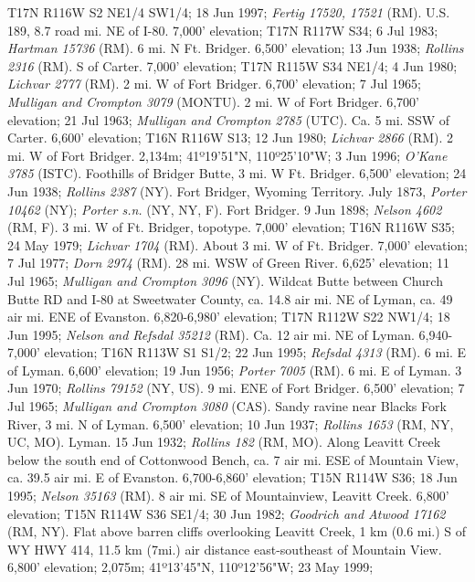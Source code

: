 T17N R116W S2 NE1/4 SW1/4; 18 Jun 1997; \textit{Fertig 17520, 17521} (RM).
U.S. 189, 8.7 road mi. NE of I-80. 7,000' elevation; T17N R117W S34; 6 Jul 1983;
\textit{Hartman 15736} (RM).
6 mi. N Ft. Bridger. 6,500' elevation; 13 Jun 1938; \textit{Rollins 2316} (RM).
S of Carter. 7,000' elevation; T17N R115W S34 NE1/4; 4 Jun 1980;
\textit{Lichvar 2777} (RM).
2 mi. W of Fort Bridger. 6,700’ elevation; 7 Jul 1965;
\textit{Mulligan and Crompton 3079} (MONTU).
2 mi. W of Fort Bridger. 6,700’ elevation; 21 Jul 1963;
\textit{Mulligan and Crompton 2785} (UTC).
Ca. 5 mi. SSW of Carter. 6,600' elevation; T16N R116W S13; 12 Jun 1980;
\textit{Lichvar 2866} (RM).
2 mi. W of Fort Bridger. 2,134m; 41º19'51"N, 110º25'10"W; 3 Jun 1996;
\textit{O'Kane 3785} (ISTC).
Foothills of Bridger Butte, 3 mi. W Ft. Bridger. 6,500’ elevation; 24 Jun 1938;
\textit{Rollins 2387} (NY).
Fort Bridger, Wyoming Territory. July 1873, \textit{Porter 10462} (NY);
\textit{Porter s.n.} (NY, NY, F).
Fort Bridger. 9 Jun 1898; \textit{Nelson 4602} (RM, F).
3 mi. W of Ft. Bridger, topotype.	7,000' elevation; T16N R116W S35; 24 May 1979;
\textit{Lichvar 1704} (RM).
About 3 mi. W of Ft. Bridger. 7,000' elevation;	7 Jul 1977;
\textit{Dorn 2974} (RM).
28 mi. WSW of Green River. 6,625’ elevation; 11 Jul 1965;
\textit{Mulligan and Crompton 3096} (NY).
Wildcat Butte between Church Butte RD and I-80 at Sweetwater County,
ca. 14.8 air mi. NE of Lyman, ca. 49 air mi. ENE of Evanston.
6,820-6,980' elevation; T17N R112W S22 NW1/4; 18 Jun 1995;
\textit{Nelson and Refsdal 35212} (RM).
Ca. 12 air mi. NE of Lyman. 6,940-7,000' elevation; T16N R113W S1 S1/2;
22 Jun 1995; \textit{Refsdal 4313} (RM).
6 mi. E of Lyman. 6,600’ elevation; 19 Jun 1956; \textit{Porter 7005} (RM).
6 mi. E of Lyman. 3 Jun 1970; \textit{Rollins 79152} (NY, US).
9 mi. ENE of Fort Bridger. 6,500’ elevation; 7 Jul 1965;
\textit{Mulligan and Crompton 3080} (CAS).
Sandy ravine near Blacks Fork River, 3 mi. N of Lyman. 6,500' elevation;
10 Jun 1937; \textit{Rollins 1653} (RM, NY, UC, MO).
Lyman. 15 Jun 1932; \textit{Rollins 182} (RM, MO).
Along Leavitt Creek below the south end of Cottonwood Bench, ca. 7 air mi. ESE
of Mountain View, ca. 39.5 air mi. E of Evanston.	6,700-6,860' elevation;
T15N R114W S36; 18 Jun 1995; \textit{Nelson 35163} (RM).
8 air mi. SE of Mountainview, Leavitt Creek. 6,800' elevation;
T15N R114W S36 SE1/4; 30 Jun 1982; \textit{Goodrich and Atwood 17162} (RM, NY).
Flat above barren cliffs overlooking Leavitt Creek, 1 km (0.6 mi.) S of WY HWY
414, 11.5 km (7mi.) air distance east-southeast of Mountain View.
6,800' elevation; 2,075m; 41º13'45"N, 110º12'56"W; 23 May 1999;
